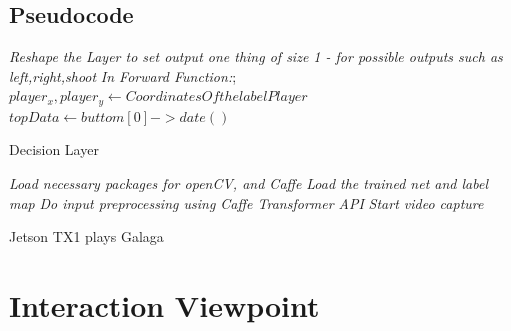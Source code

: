 \documentclass[onecolumn, draftclsnofoot,10pt, compsoc]{IEEEtran}
\begin{document}
\subsection{Pseudocode}\label{sssec:num3}
\begin{algorithm}
  \emph{Reshape the Layer to set output one thing of size 1 - for possible outputs such as left,right,shoot}\;
  \emph{In Forward Function:};\newline
  \nl$player_x,player_y\leftarrow Coordinates Of the label Player$\;
  \nl$topData\leftarrow buttom[0]->date()$\;

    \caption{Decision Layer}
\end{algorithm}

\begin{algorithm}
  \emph{Load necessary packages for openCV, and Caffe}\;
  \emph{Load the trained net and label map}\;
  \emph{Do input preprocessing using Caffe Transformer API}\;
  \emph{Start video capture}\;

    \caption{Jetson TX1 plays Galaga}
\end{algorithm}

\section{Interaction Viewpoint}\label{sssec:num1}%
\end{document}
